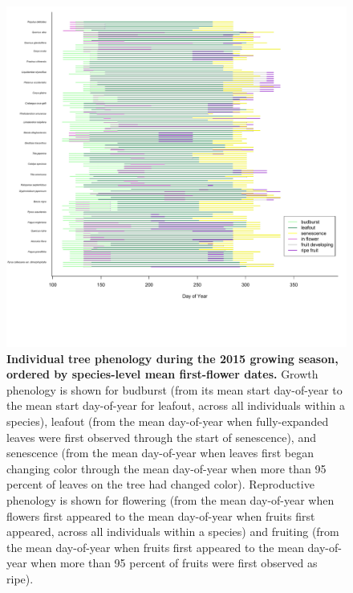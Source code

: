 \documentclass{article}
\begin{document}
\begin{figure}[h]
  \centering
  \includegraphics{../analyses/figures/grosea_repsort_ripefruit_ind_legend.pdf}
  \caption{\textbf{Individual tree phenology during the 2015 growing season, ordered by species-level mean first-flower dates.} Growth phenology is shown for budburst (from its mean start day-of-year to the mean start day-of-year for leafout, across all individuals within a species), leafout (from the mean day-of-year when fully-expanded leaves were first observed through the start of senescence), and senescence (from the mean day-of-year when leaves first began changing color through the mean day-of-year when more than 95 percent of leaves on the tree had changed color). Reproductive phenology is shown for flowering (from the mean day-of-year when flowers first appeared to the mean day-of-year when fruits first appeared, across all individuals within a species) and fruiting (from the mean day-of-year when fruits first appeared to the mean day-of-year when more than 95 percent of fruits were first observed as ripe).}
 \label{fig:focind}
\end{figure}
  
\end{document}
